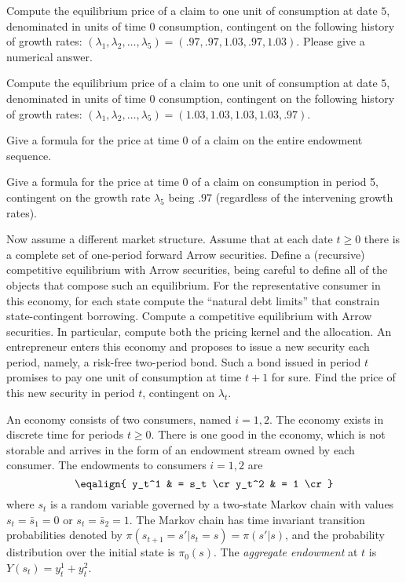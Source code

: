 \medskip
{}  Compute the equilibrium price of a claim to one
unit of consumption at date $5$, denominated in units of time $0$
consumption, contingent on the following history of growth rates:
$(\lambda_1, \lambda_2, \ldots, \lambda_5) =( .97, .97, 1.03, .97,
1.03)$.  Please give a numerical answer.

\medskip
{}  Compute the equilibrium price of a claim to one
unit of consumption at date $5$, denominated in units of time $0$
consumption, contingent on the following history of growth rates:
$(\lambda_1, \lambda_2, \ldots, \lambda_5) = (1.03,  1.03, 1.03,
1.03, .97)$.



\medskip
{}  Give a formula for the price at time $0$ of a
claim on the entire endowment sequence.

\medskip
{}  Give a formula for the price at time $0$ of a
claim on consumption in period 5,   contingent on the growth rate
$\lambda_5$ being $.97$ (regardless of the intervening growth
rates).

\vfil\eject

\medskip
{}

\medskip
\noindent Now assume a different market structure.  Assume that at
each date $t\geq 0$ there  is a complete set of one-period forward
Arrow securities.
\medskip
{}  Define a (recursive) competitive equilibrium
with Arrow securities, being careful to define all of the objects
that compose such an equilibrium.
\medskip
{} For the representative consumer in this
economy, for each state compute the ``natural debt limits'' that
constrain state-contingent borrowing.
\medskip
{} Compute a competitive equilibrium with Arrow
securities. In particular,  compute both the pricing kernel and
the allocation.
\medskip
{}  An entrepreneur       enters this economy and
proposes to issue a new security each period,  namely, a risk-free
two-period bond.  Such a bond issued in period $t$ promises to pay
one unit of  consumption at time $t+1$ for sure. Find the price of
this new security in period $t$, contingent on $\lambda_t$.







\medskip
{} \quad
\medskip
\noindent  An economy consists of two consumers, named $i=1,2$.
The economy exists in discrete time  for periods $t \geq 0$.
There is one good in the economy, which is not storable and
arrives in the form of an endowment stream owned by each consumer.
The endowments to consumers $i=1,2$ are
$$\eqalign{ y_t^1 & = s_t \cr
            y_t^2 & = 1 \cr }  $$
where $s_t$ is a random variable governed by a two-state Markov
chain with values $s_t = \bar s_1 = 0$ or  $s_t  = \bar s_2 = 1 $.
The Markov chain  has time invariant transition probabilities
denoted by $\pi(s_{t+1} =  s' | s_t = s) = \pi(s'|s)$, and the
probability distribution over the initial  state is $\pi_0(s)$.
The {\it aggregate endowment} at $t$ is $Y(s_t) = y_t^1 + y_t^2$.


